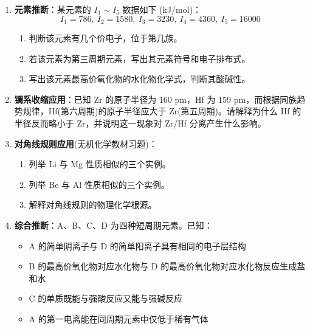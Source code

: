 \begin{enumerate}
  \begin{enumerate}
  \def\labelenumii{(\arabic{enumii})}
  \tightlist
  \item
    解释为什么 Mg 的第一电离能大于 Al。
  \item
    解释为什么 P 的第一电离能大于 S。
  \item
    解释为什么 F 的电负性大于 Cl，但电子亲和能 Cl 大于 F。
  \end{enumerate}
\item
  \textbf{元素推断}：某元素的 \(I_1\sim I_5\) 数据如下 (kJ/mol)：
  \[I_1=786,\ I_2=1580,\ I_3=3230,\ I_4=4360,\ I_5=16000\]

  \begin{enumerate}
  \def\labelenumii{(\arabic{enumii})}
  \tightlist
  \item
    判断该元素有几个价电子，位于第几族。
  \item
    若该元素为第三周期元素，写出其元素符号和电子排布式。
  \item
    写出该元素最高价氧化物的水化物化学式，判断其酸碱性。
  \end{enumerate}
\item
  \textbf{镧系收缩应用}：已知 Zr 的原子半径为 160 pm，Hf 为 159 pm，而根据同族趋势规律，Hf(第六周期)的原子半径应大于 Zr(第五周期)。请解释为什么 Hf 的半径反而略小于 Zr，并说明这一现象对 Zr/Hf 分离产生什么影响。
\item
  \textbf{对角线规则应用}(无机化学教材习题)：

  \begin{enumerate}
  \def\labelenumii{(\arabic{enumii})}
  \tightlist
  \item
    列举 Li 与 Mg 性质相似的三个实例。
  \item
    列举 Be 与 Al 性质相似的三个实例。
  \item
    解释对角线规则的物理化学根源。
  \end{enumerate}
\item
  \textbf{综合推断}：A、B、C、D 为四种短周期元素。已知：

  \begin{itemize}
  \tightlist
  \item
    A 的简单阴离子与 D 的简单阳离子具有相同的电子层结构
  \item
    B 的最高价氧化物对应水化物与 D 的最高价氧化物对应水化物反应生成盐和水
  \item
    C 的单质既能与强酸反应又能与强碱反应
  \item
    A 的第一电离能在同周期元素中仅低于稀有气体
  \end{itemize}


\end{enumerate}
